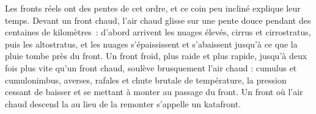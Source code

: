 Les fronts réels ont des pentes de cet ordre, et ce coin peu incliné explique leur temps. Devant un front
chaud, l'air chaud glisse sur une pente douce pendant des centaines de kilomètres~: d'abord arrivent les nuages
élevés, cirrus et cirrostratus, puis les altostratus, et les nuages s'épaississent et s'abaissent jusqu'à ce que la pluie
tombe près du front. Un front froid, plus raide et plus rapide, jusqu'à deux fois plus vite qu'un front
chaud, soulève brusquement l'air chaud : cumulus et cumulonimbus, averses, rafales et chute brutale
de température, la pression cessant de baisser et se mettant à monter au passage du front. Un front
où l'air chaud descend la  au lieu de la remonter s'appelle un katafront.

